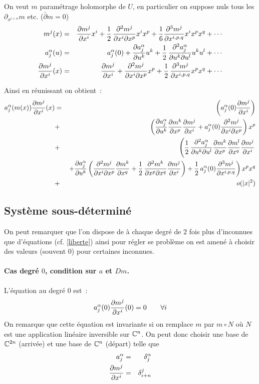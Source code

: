 \documentclass[a4paper,draft]{amsart}
\begin{document}
On veut $m$ paramétrage holomorphe de $U$, en particulier on suppose nuls tous les $\partial_{x^{i+n}}m$ etc. ($\bar\partial m = 0$)
\begin{eqnarray}
m^j(x) &=& \dfrac{\partial{m^j}}{\partial{x^i}}x^i + \operatorname{\frac{1}{2}} \dfrac{\partial^2 m^j}{\partial x^i \partial x^p}x^ix^p + \dfrac{1}{6} \dfrac{\partial^3 m^j}{\partial x^{i,p,q}}x^i x^p x^q + \cdots \\
a_j^\alpha(u) &=& a_j^\alpha(0) + \dfrac{\partial{a_j^\alpha}}{\partial{u^k}}u^k + \operatorname{\frac{1}{2}} \dfrac{\partial^2 a_j^\alpha}{\partial u^k \partial u^l}u^k u^l + \cdots \\
\dfrac{\partial{m^j}}{\partial{x^i}}(x) &=& \dfrac{\partial{m^j}}{\partial{x^i}} + \dfrac{\partial^2 m^j}{\partial x^i \partial x^p}x^p + \operatorname{\frac{1}{2}} \dfrac{\partial^3 m^j}{\partial x^{i,p,q}}x^p x^q + \cdots
\end{eqnarray}

Ainsi en réunissant on obtient~:
\begin{eqnarray*}
a_j^\alpha(m(x))\dfrac{\partial{m^j}}{\partial{x^i}}(x) &=& \left(a_j^\alpha(0)\dfrac{\partial{m^j}}{\partial{x^i}}\right)\\
 & + & \left(
 \dfrac{\partial{a_j^\alpha}}{\partial{u^k}}\dfrac{\partial{m^k}}{\partial{x^p}}\dfrac{\partial{m^j}}{\partial{x^i}} + a_j^\alpha(0)\dfrac{\partial^2 m^j}{\partial x^i \partial x^p}
  \right)x^p \\
 & + & \left( 
 \operatorname{\frac{1}{2}} \dfrac{\partial^2 a_j^\alpha}{\partial u^k \partial u^l}\dfrac{\partial{m^k}}{\partial{x^p}}\dfrac{\partial{m^l}}{\partial{x^q}}\dfrac{\partial{m^j}}{\partial{x^i}} 
 \right.\\
 & &\left. + \dfrac{\partial{a_j^\alpha}}{\partial{u^k}}\left( \dfrac{\partial^2 m^j}{\partial x^i \partial x^p}\dfrac{\partial{m^k}}{\partial{x^q}} + \operatorname{\frac{1}{2}} \dfrac{\partial^2 m^k}{\partial x^p \partial x^q}\dfrac{\partial{m^j}}{\partial{x^i}}
 \right)+ \operatorname{\frac{1}{2}} a_j^\alpha(0) \dfrac{\partial^3 m^j}{\partial x^{i,p,q}}
 \right)x^px^q \\
 & + & o(|x|^2)
\end{eqnarray*}

\subsection{Système sous-déterminé}
On peut remarquer que l'on dispose de à chaque degré de $2$ fois plus d'inconnues que d'équations (cf. \ref{liberte}) ainsi pour régler se problème on est amené à choisir des valeurs (souvent $0$) pour certaines inconnues.
\paragraph{Cas degré $0$, condition sur $a$ et $Dm$.} L'équation au degré $0$ est~:
\[
a_j^\alpha(0)\dfrac{\partial{m^j}}{\partial{x^i}}(0) = 0 \qquad \forall i
\]
On remarque que cette équation est invariante si on remplace $m$ par $m \circ N$ où $N$ est une application linéaire inversible sur $\mathbb{C}^n$. On peut donc choisir une base de $\mathbb{C}^{2n}$ (arrivée) et une base de $\mathbb{C}^n$ (départ) telle que
\begin{eqnarray}
a_j^\alpha &=& \delta_j^\alpha \\
\dfrac{\partial{m^j}}{\partial{x^i}} &=& \delta^j_{i+n}
\end{eqnarray} 
\end{document}
